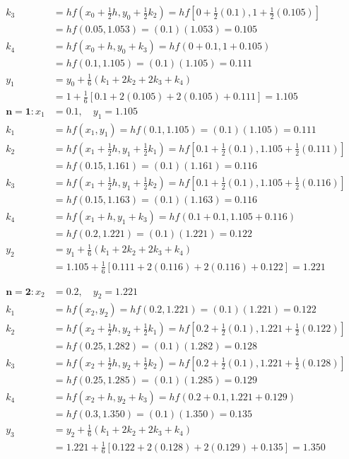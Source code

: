 \documentclass[10pt]{article}
\begin{document}
$$
\begin{aligned}
k_{3} & =h f\left(x_{0}+\frac{1}{2} h, y_{0}+\frac{1}{2} k_{2}\right)=h f\left[0+\frac{1}{2}(0.1), 1+\frac{1}{2}(0.105)\right] \\
& =h f(0.05,1.053)=(0.1)(1.053)=0.105 \\
k_{4} & =h f\left(x_{0}+h, y_{0}+k_{3}\right)=h f(0+0.1,1+0.105) \\
& =h f(0.1,1.105)=(0.1)(1.105)=0.111 \\
y_{1} & =y_{0}+\frac{1}{6}\left(k_{1}+2 k_{2}+2 k_{3}+k_{4}\right) \\
& =1+\frac{1}{6}[0.1+2(0.105)+2(0.105)+0.111]=1.105 \\
\mathbf{n = 1 :} x_{1} & =0.1, \quad y_{1}=1.105 \\
k_{1} & =h f\left(x_{1}, y_{1}\right)=h f(0.1,1.105)=(0.1)(1.105)=0.111 \\
k_{2} & =h f\left(x_{1}+\frac{1}{2} h, y_{1}+\frac{1}{2} k_{1}\right)=h f\left[0.1+\frac{1}{2}(0.1), 1.105+\frac{1}{2}(0.111)\right] \\
& =h f(0.15,1.161)=(0.1)(1.161)=0.116 \\
k_{3} & =h f\left(x_{1}+\frac{1}{2} h, y_{1}+\frac{1}{2} k_{2}\right)=h f\left[0.1+\frac{1}{2}(0.1), 1.105+\frac{1}{2}(0.116)\right] \\
& =h f(0.15,1.163)=(0.1)(1.163)=0.116 \\
k_{4} & =h f\left(x_{1}+h, y_{1}+k_{3}\right)=h f(0.1+0.1,1.105+0.116) \\
& =h f(0.2,1.221)=(0.1)(1.221)=0.122 \\
y_{2} & =y_{1}+\frac{1}{6}\left(k_{1}+2 k_{2}+2 k_{3}+k_{4}\right) \\
& =1.105+\frac{1}{6}[0.111+2(0.116)+2(0.116)+0.122]=1.221
\end{aligned}
$$

$$
\begin{aligned}
\boldsymbol{n}=\mathbf{2}: x_{2} & =0.2, \quad y_{2}=1.221 \\
k_{1} & =h f\left(x_{2}, y_{2}\right)=h f(0.2,1.221)=(0.1)(1.221)=0.122 \\
k_{2} & =h f\left(x_{2}+\frac{1}{2} h, y_{2}+\frac{1}{2} k_{1}\right)=h f\left[0.2+\frac{1}{2}(0.1), 1.221+\frac{1}{2}(0.122)\right] \\
& =h f(0.25,1.282)=(0.1)(1.282)=0.128 \\
k_{3} & =h f\left(x_{2}+\frac{1}{2} h, y_{2}+\frac{1}{2} k_{2}\right)=h f\left[0.2+\frac{1}{2}(0.1), 1.221+\frac{1}{2}(0.128)\right] \\
& =h f(0.25,1.285)=(0.1)(1.285)=0.129 \\
k_{4} & =h f\left(x_{2}+h, y_{2}+k_{3}\right)=h f(0.2+0.1,1.221+0.129) \\
& =h f(0.3,1.350)=(0.1)(1.350)=0.135 \\
y_{3} & =y_{2}+\frac{1}{6}\left(k_{1}+2 k_{2}+2 k_{3}+k_{4}\right) \\
& =1.221+\frac{1}{6}[0.122+2(0.128)+2(0.129)+0.135]=1.350
\end{aligned}
$$
\end{document}
